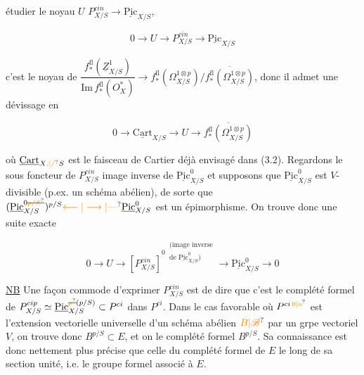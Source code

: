 
étudier le noyau $U$   $P^{cin}_{X/S}\to\underline{\mathrm{Pic}}_{X/S}$,

\[
0\longrightarrow U\longrightarrow P^{cin}_{X/S}\longrightarrow\underline{\mathrm{Pic}}_{X/S}\tag*{(4.4)}
\]

c'est le noyau de $\dfrac{f_*^{\mathrm{fl}}(\underline Z^1_{X/S})}{\mathrm{Im}\,f_*^{\mathrm{fl}}(O^*_{X})}\longrightarrow f_*^{\mathrm{fl}}(\Omega^{1\otimes p}_{X/S})/\overline{f_*^{\mathrm{fl}}(\Omega^{1\otimes p}_{X/S})}$, donc il admet une dévissage en

\[
0\longrightarrow\underline{\mathrm{Cart}}_{X/S}\longrightarrow U\longrightarrow\overline{f_*^{\mathrm{fl}}(\Omega^{1\otimes p}_{X/S})}\tag*{(4.5)}
\]


où $\underline{\mathrm{Cart}}_{X\unsure{,|/}S}$ est le faisceau de Cartier déjà envisagé dans (3.2). Regardons le sous foncteur de  $P^{cin}_{X/S}$ image inverse de $\underline{\mathrm{Pic}}^0_{X/S}$ et supposons que $\underline{\mathrm{Pic}}^0_{X/S}$ est $V$-divisible (p.ex. un schéma abélien), de sorte que $(\underline{\mathrm{Pic}}^{0\deleted{\unsure{p/S}}}_{X/S})^{p/S}\unsure{\longleftarrow|\longrightarrow|\text{—}}\underline{\mathrm{Pic}}^0_{X/S}$ est un épimorphisme. On trouve donc une suite exacte

\[
0\longrightarrow U\longrightarrow [P^{cin}_{X/S}]^{0\ \substack{\text{(image inverse}\\\text{de }\underline{\mathrm{Pic}}^0_{X/S})}}\longrightarrow\underline{\mathrm{Pic}}^0_{X/S}\longrightarrow0\tag*{(4.6)}
\]

\uline{NB} Une façon commode d'exprimer $P^{cin}_{X/S}$ est de dire que c'est le complété formel de $P^{cip}_{X/S}\simeq\underline{\mathrm{Pic}}_{X/S}^{\deleted{\unsure{p}}(p/S)}\subset P^{ci}$ dans $P^{ci}$. Dans le cas favorable où $P^{ci\,\unsure{0|o}}$ est l'extension vectorielle universelle  d'un schéma abélien $\unsure{B|\mathscr B}$ par un grpe vectoriel $V$, on trouve   donc $B^{p/S}\subset E$, et on   le complété formel   $B^{p/S}$. Sa connaissance est donc nettement plus précise que celle du complété formel  de $E$ le long de sa section unité, i.e. le groupe formel associé à $E$.


